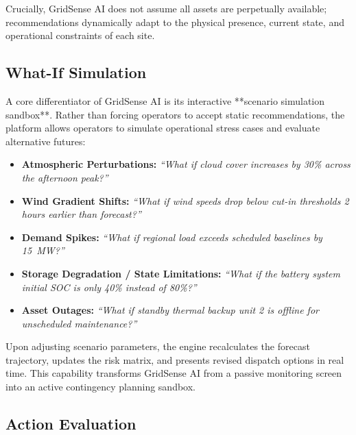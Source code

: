 Crucially, GridSense AI does not assume all assets are perpetually available; recommendations dynamically adapt to the physical presence, current state, and operational constraints of each site.

\subsection{What-If Simulation}
\label{subsec:what_if_simulation}

A core differentiator of GridSense AI is its interactive **scenario simulation sandbox**. Rather than forcing operators to accept static recommendations, the platform allows operators to simulate operational stress cases and evaluate alternative futures:
\begin{itemize}[leftmargin=1.8em, itemsep=0.2em]
    \item \textbf{Atmospheric Perturbations:} \emph{``What if cloud cover increases by 30\% across the afternoon peak?''}
    \item \textbf{Wind Gradient Shifts:} \emph{``What if wind speeds drop below cut-in thresholds 2 hours earlier than forecast?''}
    \item \textbf{Demand Spikes:} \emph{``What if regional load exceeds scheduled baselines by 15~MW?''}
    \item \textbf{Storage Degradation / State Limitations:} \emph{``What if the battery system initial SOC is only 40\% instead of 80\%?''}
    \item \textbf{Asset Outages:} \emph{``What if standby thermal backup unit 2 is offline for unscheduled maintenance?''}
\end{itemize}

Upon adjusting scenario parameters, the engine recalculates the forecast trajectory, updates the risk matrix, and presents revised dispatch options in real time. This capability transforms GridSense AI from a passive monitoring screen into an active contingency planning sandbox.

\subsection{Action Evaluation}
\label{subsec:action_evaluation}

